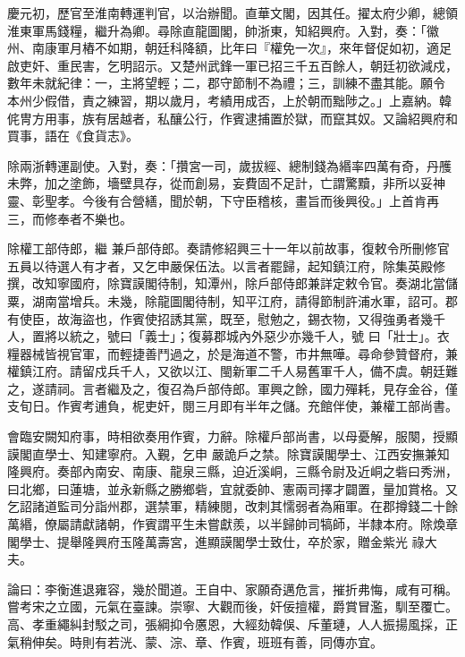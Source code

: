 \begin{pinyinscope}
 慶元初，歷官至淮南轉運判官，以治辦聞。直華文閣，因其任。擢太府少卿，總領淮東軍馬錢糧，繼升為卿。尋除直龍圖閣，帥浙東，知紹興府。入對，奏：「徽州、南康軍月樁不如期，朝廷科降額，比年曰『權免一次』，來年督促如初，適足啟吏奸、重民害，乞明詔示。又楚州武鋒一軍已招三千五百餘人，朝廷初欲減戍，數年未就紀律：一，主將望輕；二，郡守節制不為禮；三，訓練不盡其能。願令
 本州少假借，責之練習，期以歲月，考績用成否，上於朝而黜陟之。」上嘉納。韓侂冑方用事，族有居越者，私釀公行，作賓逮捕置於獄，而竄其奴。又論紹興府和買事，語在《食貨志》。



 除兩浙轉運副使。入對，奏：「攢宮一司，歲拔經、總制錢為緡率四萬有奇，丹雘未弊，加之塗飾，墻壁具存，從而創易，妄費固不足計，亡謂驚黷，非所以妥神靈、彰聖孝。今後有合營繕，聞於朝，下守臣稽核，畫旨而後興役。」上首肯再三，而修奉者不樂也。



 除權工部侍郎，繼
 兼戶部侍郎。奏請修紹興三十一年以前故事，復敕令所刪修官五員以待選人有才者，又乞申嚴保伍法。以言者罷歸，起知鎮江府，除集英殿修撰，改知寧國府，除寶謨閣待制，知潭州，除戶部侍郎兼詳定敕令官。奏湖北當儲粟，湖南當增兵。未幾，除龍圖閣待制，知平江府，請得節制許浦水軍，詔可。郡有使臣，故海盜也，作賓使招誘其黨，既至，慰勉之，錫衣物，又得強勇者幾千人，置將以統之，號曰「義士」；復募郡城內外惡少亦幾千人，號
 曰「壯士」。衣糧器械皆視官軍，而輕捷善鬥過之，於是海道不警，市井無嘩。尋命參贊督府，兼權鎮江府。請留戍兵千人，又欲以江、閩新軍二千人易舊軍千人，備不虞。朝廷難之，遂請祠。言者繼及之，復召為戶部侍郎。軍興之餘，國力殫耗，見存金谷，僅支旬日。作賓考逋負，柅吏奸，閱三月即有半年之儲。充館伴使，兼權工部尚書。



 會臨安闕知府事，時相欲奏用作賓，力辭。除權戶部尚書，以母憂解，服闋，授顯謨閣直學士、知建寧府。入覲，乞申
 嚴詭戶之禁。除寶謨閣學士、江西安撫兼知隆興府。奏部內南安、南康、龍泉三縣，迫近溪峒，三縣令尉及近峒之砦曰秀洲，曰北鄉，曰蓮塘，並永新縣之勝鄉砦，宜就委帥、憲兩司擇才闢置，量加賞格。又乞詔諸道監司分詣州郡，選禁軍，精練閱，改刺其懦弱者為廂軍。在郡撙錢二十餘萬緡，僚屬請獻諸朝，作賓謂平生未嘗獻羨，以半歸帥司犒師，半隸本府。除煥章閣學士、提舉隆興府玉隆萬壽宮，進顯謨閣學士致仕，卒於家，贈金紫光
 祿大夫。



 論曰：李衡進退雍容，幾於聞道。王自中、家願奇邁危言，摧折弗悔，咸有可稱。嘗考宋之立國，元氣在臺諫。崇寧、大觀而後，奸佞擅權，爵賞冒濫，馴至覆亡。高、孝重繩糾封駁之司，張綱抑令懬恩，大經劾韓俁、斥董璉，人人振揚風採，正氣稍伸矣。時則有若洸、蒙、淙、章、作賓，班班有善，同傳亦宜。



\end{pinyinscope}